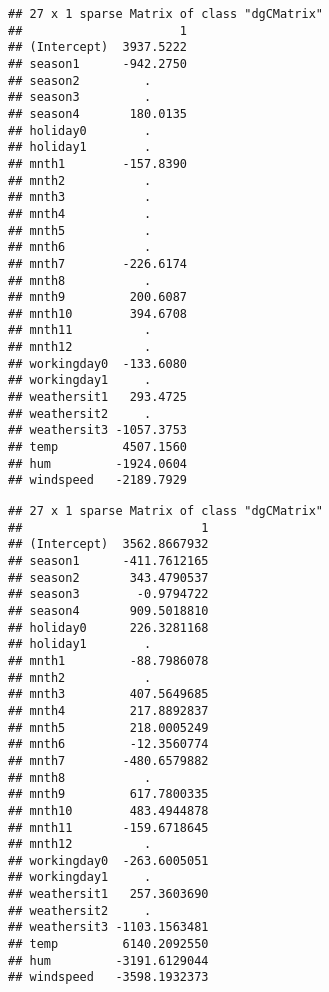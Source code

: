 \documentclass[]{article}
\newenvironment{Shaded}{\begin{snugshade}}{\end{snugshade}}
\newcommand{\DataTypeTok}[1]{\textcolor[rgb]{0.13,0.29,0.53}{#1}}
\newcommand{\DecValTok}[1]{\textcolor[rgb]{0.00,0.00,0.81}{#1}}
\newcommand{\FloatTok}[1]{\textcolor[rgb]{0.00,0.00,0.81}{#1}}
\newcommand{\KeywordTok}[1]{\textcolor[rgb]{0.13,0.29,0.53}{\textbf{#1}}}
\newcommand{\NormalTok}[1]{#1}
\newcommand{\OperatorTok}[1]{\textcolor[rgb]{0.81,0.36,0.00}{\textbf{#1}}}
\newcommand{\StringTok}[1]{\textcolor[rgb]{0.31,0.60,0.02}{#1}}
\begin{document}
\begin{verbatim}
## 27 x 1 sparse Matrix of class "dgCMatrix"
##                      1
## (Intercept)  3937.5222
## season1      -942.2750
## season2         .     
## season3         .     
## season4       180.0135
## holiday0        .     
## holiday1        .     
## mnth1        -157.8390
## mnth2           .     
## mnth3           .     
## mnth4           .     
## mnth5           .     
## mnth6           .     
## mnth7        -226.6174
## mnth8           .     
## mnth9         200.6087
## mnth10        394.6708
## mnth11          .     
## mnth12          .     
## workingday0  -133.6080
## workingday1     .     
## weathersit1   293.4725
## weathersit2     .     
## weathersit3 -1057.3753
## temp         4507.1560
## hum         -1924.0604
## windspeed   -2189.7929
\end{verbatim}

\begin{Shaded}
\end{Shaded}

\begin{verbatim}
## 27 x 1 sparse Matrix of class "dgCMatrix"
##                         1
## (Intercept)  3562.8667932
## season1      -411.7612165
## season2       343.4790537
## season3        -0.9794722
## season4       909.5018810
## holiday0      226.3281168
## holiday1        .        
## mnth1         -88.7986078
## mnth2           .        
## mnth3         407.5649685
## mnth4         217.8892837
## mnth5         218.0005249
## mnth6         -12.3560774
## mnth7        -480.6579882
## mnth8           .        
## mnth9         617.7800335
## mnth10        483.4944878
## mnth11       -159.6718645
## mnth12          .        
## workingday0  -263.6005051
## workingday1     .        
## weathersit1   257.3603690
## weathersit2     .        
## weathersit3 -1103.1563481
## temp         6140.2092550
## hum         -3191.6129044
## windspeed   -3598.1932373
\end{verbatim}
\end{document}
